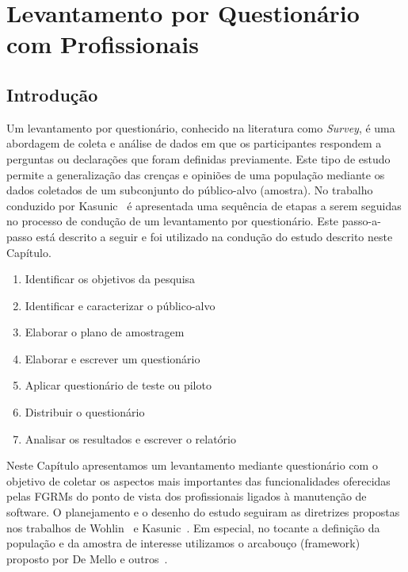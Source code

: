 \chapter{Levantamento por Questionário com Profissionais}
\label{ch:pesquisa-profissionais}

\section{Introdução}
\label{sec:pesquisa-profissionais-intro}

Um levantamento por questionário, conhecido na literatura como \textit{Survey},
é uma abordagem de coleta e análise de dados em que os participantes respondem a
perguntas ou declarações que foram definidas previamente. Este tipo de estudo
permite a generalização das crenças e opiniões de uma população mediante os
dados coletados de um subconjunto do público-alvo (amostra). No trabalho
conduzido por Kasunic~\cite{kasunic2005designing} é apresentada uma sequência de
etapas a serem seguidas no processo de condução de um levantamento por
questionário. Este passo-a-passo está descrito a seguir e foi utilizado na
condução do estudo descrito neste Capítulo.

\begin{enumerate}
    \item{Identificar os objetivos da pesquisa}
    \item{Identificar e caracterizar o público-alvo}
    \item{Elaborar o plano de amostragem}
    \item{Elaborar e escrever um questionário}
    \item{Aplicar questionário de teste ou piloto}
    \item{Distribuir o questionário}
    \item{Analisar os resultados e escrever o relatório}
\end{enumerate}

Neste Capítulo apresentamos um levantamento mediante questionário com o objetivo
de coletar os aspectos mais importantes das funcionalidades oferecidas pelas
FGRMs do ponto de vista dos profissionais ligados à manutenção de software. O
planejamento e o desenho do estudo seguiram as diretrizes propostas nos
trabalhos de Wohlin~\cite{wohlin2012experimentation} e
Kasunic~\cite{kasunic2005designing}. Em especial, no tocante a definição da
população e da amostra de interesse utilizamos o arcabouço (framework) proposto
por De Mello e outros~\cite{de2015investigating, de2014towards}.

